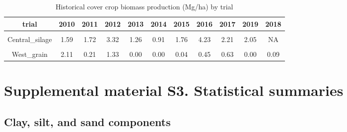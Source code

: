 \documentclass[
]{article}
\begin{document}
\begin{table}[H]

\caption{\label{tab:ccbio}Historical cover crop biomass production (Mg/ha) by trial}
\centering
\begin{tabular}[t]{ccccccccccc}
\toprule
trial & 2010 & 2011 & 2012 & 2013 & 2014 & 2015 & 2016 & 2017 & 2019 & 2018\\
\midrule
\cellcolor{gray!6}{Central\_grain} & \cellcolor{gray!6}{0.86} & \cellcolor{gray!6}{0.28} & \cellcolor{gray!6}{1.37} & \cellcolor{gray!6}{0.25} & \cellcolor{gray!6}{0.47} & \cellcolor{gray!6}{0.61} & \cellcolor{gray!6}{2.22} & \cellcolor{gray!6}{2.76} & \cellcolor{gray!6}{1.29} & \cellcolor{gray!6}{NA}\\
Central\_silage & 1.59 & 1.72 & 3.32 & 1.26 & 0.91 & 1.76 & 4.23 & 2.21 & 2.05 & NA\\
\cmidrule{1-11}
\cellcolor{gray!6}{East\_grain} & \cellcolor{gray!6}{2.11} & \cellcolor{gray!6}{1.46} & \cellcolor{gray!6}{0.00} & \cellcolor{gray!6}{0.92} & \cellcolor{gray!6}{0.00} & \cellcolor{gray!6}{0.36} & \cellcolor{gray!6}{0.51} & \cellcolor{gray!6}{7.30} & \cellcolor{gray!6}{0.30} & \cellcolor{gray!6}{0.19}\\
West\_grain & 2.11 & 0.21 & 1.33 & 0.00 & 0.00 & 0.04 & 0.45 & 0.63 & 0.00 & 0.09\\
\bottomrule
\end{tabular}
\end{table}

\newpage

\hypertarget{supplemental-material-s3.-statistical-summaries}{%
\section{Supplemental material S3. Statistical
summaries}\label{supplemental-material-s3.-statistical-summaries}}

\hypertarget{clay-silt-and-sand-components}{%
\subsection{Clay, silt, and sand
components}\label{clay-silt-and-sand-components}}
\end{document}

